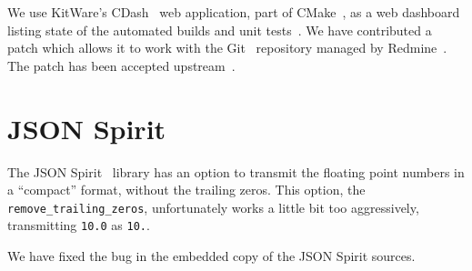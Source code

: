 \documentclass[deska]{subfiles}
\begin{document}
We use KitWare's CDash~\cite{cmake-cdash} web application, part of CMake~\cite{cmake}, as a web dashboard listing state
of the automated builds and unit tests~\cite{deska-dashboard}.  We have contributed a patch which allows it to work with
the Git~\cite{git} repository managed by Redmine~\cite{redmine}.  The patch has been accepted
upstream~\cite{cdash-redmine-patch}.

\section{JSON Spirit}

The JSON Spirit~\cite{json-spirit} library has an option to transmit the floating point numbers in a ``compact'' format,
without the trailing zeros.  This option, the {\tt remove\_trailing\_zeros}, unfortunately works a little bit too
aggressively, transmitting {\tt 10.0} as {\tt 10.}.

We have fixed the bug in the embedded copy of the JSON Spirit sources.
\end{document}
